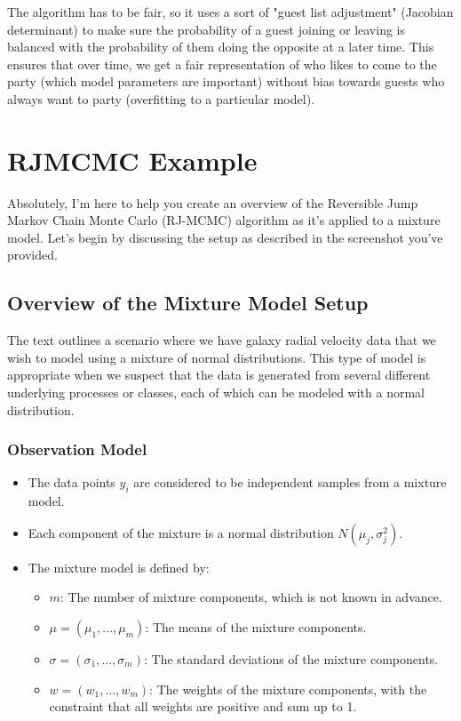 \documentclass[10pt]{article}
\begin{document}
The algorithm has to be fair, so it uses a sort of "guest list adjustment" (Jacobian determinant) to make sure the probability of a guest joining or leaving is balanced with the probability of them doing the opposite at a later time. This ensures that over time, we get a fair representation of who likes to come to the party (which model parameters are important) without bias towards guests who always want to party (overfitting to a particular model).

\section*{RJMCMC Example}
Absolutely, I'm here to help you create an overview of the Reversible Jump Markov Chain Monte Carlo (RJ-MCMC) algorithm as it's applied to a mixture model. Let's begin by discussing the setup as described in the screenshot you've provided.

\subsection*{Overview of the Mixture Model Setup}
The text outlines a scenario where we have galaxy radial velocity data that we wish to model using a mixture of normal distributions. This type of model is appropriate when we suspect that the data is generated from several different underlying processes or classes, each of which can be modeled with a normal distribution.

\subsubsection*{Observation Model}
\begin{itemize}
  \item The data points \( y_i \) are considered to be independent samples from a mixture model.
  \item Each component of the mixture is a normal distribution \( N(\mu_j, \sigma_j^2) \).
  \item The mixture model is defined by:
  \begin{itemize}
    \item \( m \): The number of mixture components, which is not known in advance.
    \item \( \mu = (\mu_1, ..., \mu_m) \): The means of the mixture components.
    \item \( \sigma = (\sigma_1, ..., \sigma_m) \): The standard deviations of the mixture components.
    \item \( w = (w_1, ..., w_m) \): The weights of the mixture components, with the constraint that all weights are positive and sum up to 1.
  \end{itemize}
\end{itemize}
\end{document}
